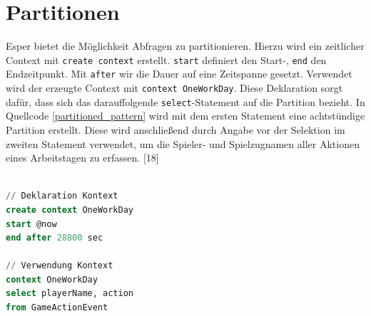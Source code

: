 \section{Partitionen}

Esper bietet die Möglichkeit Abfragen zu partitionieren.
Hierzu wird ein zeitlicher Context mit \texttt{create context} erstellt.
\texttt{start} definiert den Start-, \texttt{end} den Endzeitpunkt.
Mit \texttt{after} wir die Dauer auf eine Zeitspanne gesetzt. Verwendet wird der erzeugte Context mit \texttt{context OneWorkDay}. Diese Deklaration sorgt dafür, dass sich das darauffolgende \texttt{select}-Statement auf die Partition bezieht.
In Quellcode \ref{partitioned_pattern} wird mit dem ersten Statement eine achtstündige Partition erstellt. Diese wird anschließend durch Angabe vor der Selektion im zweiten Statement verwendet, um die Spieler- und Spielzugnamen aller Aktionen eines Arbeitstagen zu erfassen.
\cite{EsperRef2018}[18]

\begin{lstlisting}[caption={Partitioniertes Pattern},label=partitioned_pattern,captionpos=b,language=SQL]

// Deklaration Kontext
create context OneWorkDay
start @now 
end after 28800 sec

// Verwendung Kontext
context OneWorkDay 
select playerName, action 
from GameActionEvent

\end{lstlisting}
